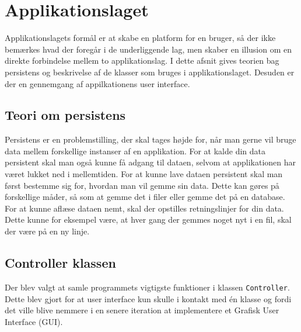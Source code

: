 \section{Applikationslaget}
Applikationslagets formål er at skabe en platform for en bruger, så der ikke bemærkes hvad der foregår i de underliggende lag, men skaber en illusion om en direkte forbindelse mellem to applikationslag.
\newline
I dette afsnit gives teorien bag persistens og beskrivelse af de klasser som bruges i applikationslaget. Desuden er der en gennemgang af appilkationens user interface.

\subsection{Teori om persistens}
Persistens er en problemstilling, der skal tages højde for, når man gerne vil bruge data mellem forskellige instanser af en applikation. For at  kalde din data persistent skal man også kunne få adgang til dataen, selvom at applikationen har været lukket ned i mellemtiden. For at kunne lave dataen persistent skal man først bestemme sig for, hvordan man vil gemme sin data. Dette kan gøres på forskellige måder, så som at gemme det i filer eller gemme det på en database. For at kunne aflæse dataen nemt, skal der opstilles retningslinjer for din data. Dette kunne for eksempel være, at hver gang der gemmes noget nyt i en fil, skal der være på en ny linje.

\subsection{Controller klassen}
Der blev valgt at samle programmets vigtigste funktioner i klassen \texttt{Controller}. Dette blev gjort for at user interface kun skulle i kontakt med én klasse og fordi det ville blive nemmere i en senere iteration at implementere et Grafisk User Interface (GUI).

